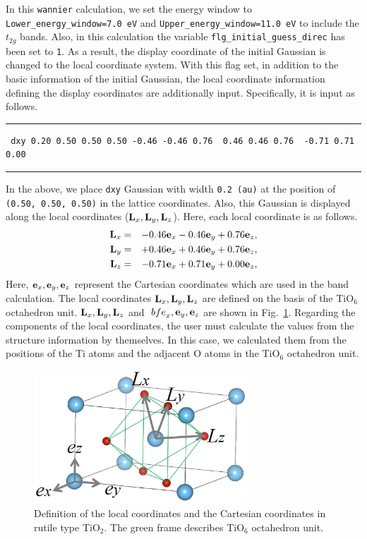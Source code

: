 \documentclass{article}
\begin{document}
In this \verb+wannier+ calculation, we set the energy window to \verb+Lower_energy_window=7.0 eV+ and  \verb+Upper_energy_window=11.0 eV+ to include the $t_{2 g}$ bands. Also, in this calculation the variable \verb+flg_initial_guess_direc+ has been set to \verb+1+. As a result, the display coordinate of the initial Gaussian is changed to the local coordinate system. With this flag set, in addition to the basic information of the initial Gaussian, the local coordinate information defining the display coordinates are additionally input. Specifically, it is input as follows.
\vspace{3mm}\hrule
\begin{verbatim}
 dxy 0.20 0.50 0.50 0.50 -0.46 -0.46 0.76  0.46 0.46 0.76  -0.71 0.71 0.00
\end{verbatim}
\hrule\vspace{3mm}
In the above, we place \verb+dxy+ Gaussian with width \verb+0.2 (au)+ at the position of \verb+(0.50, 0.50, 0.50)+ in the lattice coordinates. Also, this Gaussian is displayed along the local coordinates (${\bf L}_x, {\bf L}_y, {\bf L}_z$). Here, each local coordinate is as follows.
\begin{eqnarray} 
{\bf L}_x &=& -0.46 {\bf e}_x -0.46 {\bf e}_y + 0.76 {\bf e}_z, \nonumber \\
{\bf L}_y &=& +0.46 {\bf e}_x +0.46 {\bf e}_y + 0.76 {\bf e}_z, \nonumber \\
{\bf L}_z &=& -0.71 {\bf e}_x +0.71 {\bf e}_y + 0.00 {\bf e}_z, \nonumber 
\end{eqnarray} 
Here, ${\bf e}_x, {\bf e}_y, {\bf e}_z$ represent the Cartesian coordinates which are used in the band calculation. The local coordinates ${\bf L}_x, {\bf L}_y, {\bf L}_z$ are defined on the basis of the TiO$_6$ octahedron unit. ${\bf L}_x, {\bf L}_y, {\bf L}_z$ and ${\ bf e}_x, {\bf e}_y, {\bf e}_z$ are shown in Fig.~\ref{TiO2-local}. Regarding the components of the local coordinates, the user must calculate the values from the structure information by themselves. In this case, we calculated them from the positions of the Ti atoms and the adjacent O atoms in the TiO$_6$ octahedron unit.  
\begin{figure}[H] 
\centering
\includegraphics[width=8cm]{TiO2-local.eps}
\caption{Definition of the local coordinates and the Cartesian coordinates in rutile type TiO$_2$. The green frame describes TiO$_6$ octahedron unit.}
\label{TiO2-local}
\end{figure}
\end{document}
